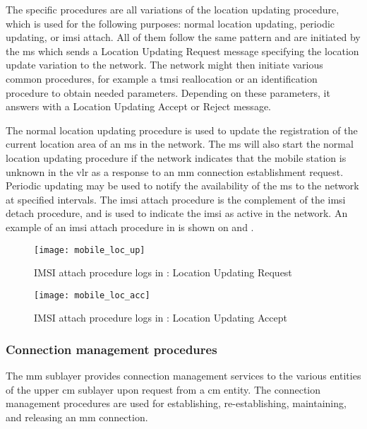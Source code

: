     The specific procedures are all variations of the location updating
    procedure, which is used for the following purposes: normal location
    updating, periodic updating, or \gls{imsi} attach. All of them
    follow the same pattern and are initiated by the \gls{ms} which
    sends a Location Updating Request message specifying the location
    update variation to the network. The network might then initiate
    various common procedures, for example a \gls{tmsi} reallocation or
    an identification procedure to obtain needed parameters. Depending
    on these parameters, it answers with a Location Updating Accept or
    Reject message.

    The normal location updating procedure is used to update the
    registration of the current location area of an \gls{ms} in the
  network. The \gls{ms} will also start the normal location updating
  procedure if the network indicates that the mobile station is
  unknown in the \gls{vlr} as a response to an \gls{mm} connection
  establishment request. Periodic updating may be used to notify the
  availability of the \gls{ms} to the network at specified intervals.
  The \gls{imsi} attach procedure is the complement of the \gls{imsi}
  detach procedure, and is used to indicate the \gls{imsi} as active
  in the network. An example of an \gls{imsi} attach procedure in
   is shown on  and
  .

    \begin{figure}[p]
      \centering
      \texttt{[image: mobile\_loc\_up]}
      \caption{IMSI attach procedure logs in : Location
      Updating Request}
      \label{fig:mobile_loc_up}
    \end{figure}

    \begin{figure}[p]
      \centering
      \texttt{[image: mobile\_loc\_acc]}
      \caption{IMSI attach procedure logs in : Location
      Updating Accept}
      \label{fig:mobile_loc_acc}
    \end{figure}

  \subsubsection{Connection management procedures}

  The \gls{mm} sublayer provides connection management services to the
  various entities of the upper \gls{cm} sublayer upon request from a
  \gls{cm} entity. The connection management procedures are used for
  establishing, re-establishing, maintaining, and releasing an
  \gls{mm} connection.

